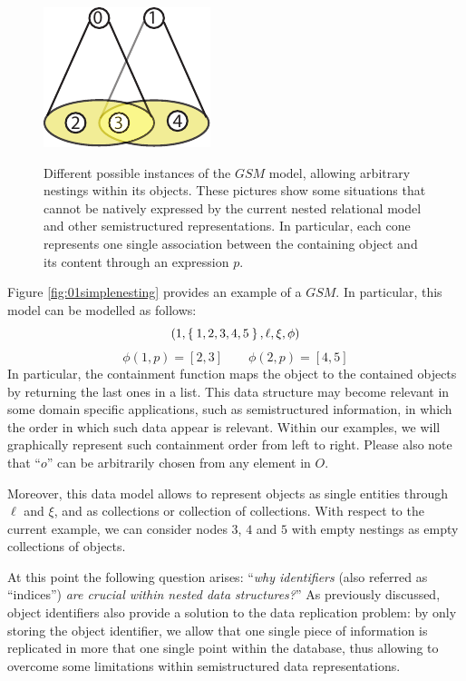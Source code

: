 \begin{figure}[!t]
	\begin{minipage}{.45\textwidth}
		\centering
		\includegraphics{fig/04model/03Overlapping}
		\label{fig:03overlapping}
	\end{minipage}
	\caption{Different possible instances of the $GSM$ model, allowing arbitrary nestings within its objects. These pictures show some situations that cannot be natively expressed by the current nested relational model and other semistructured representations. In particular, each cone represents one single association between the containing object and its content through an expression $p$.}
\end{figure}
\begin{example}[label=ex:nineteedGSMfrst]
	Figure \vref{fig:01simplenesting} provides an example of a $GSM$. In particular, this model can be modelled as follows:
	\[(1,\Set{1,2,3,4,5},\ell,\xi,\phi)\]
	\[\phi(1,p)=[2,3]\qquad \phi(2,p)=[4,5]\]
	In particular, the containment function maps the object to the contained objects by returning the last ones in a list. This data structure may become
	relevant in some domain specific applications, such as semistructured information, in which the order in which such data appear is relevant. Within our
	examples, we will graphically represent such containment order from left to right. Please also note that ``$o$'' can be arbitrarily chosen from any element in $O$.
	
	Moreover, this data model allows to represent objects as single entities through $\ell$ and $\xi$, and as collections or collection of collections. With respect to the current example, we can consider nodes $3$, $4$ and $5$ with empty nestings as empty collections of objects.
\end{example}

At this point the following question arises: ``\textit{why identifiers} (also referred as ``indices'') \textit{are crucial within nested data structures?}'' As previously discussed, object identifiers also provide a solution to the data replication problem: by only storing the object identifier, we allow that one single piece of information is replicated in more that one single point within the database, thus allowing to overcome some limitations within semistructured data representations.

